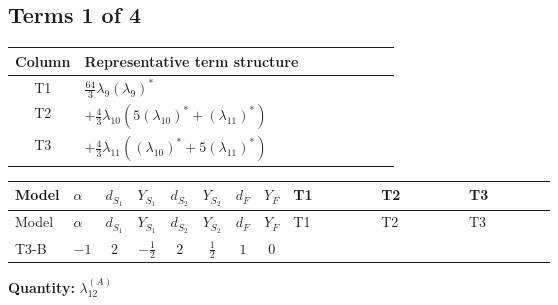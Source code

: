 \documentclass[8pt]{article}
\begin{document}
\begin{landscape}
\subsection*{Terms 1 of 4}
\begin{center}
\begin{tabular}{@{}c >{\raggedright\arraybackslash}p{0.82\linewidth}@{}}
\toprule
Column & Representative term structure \\
\midrule
T1 & \(\displaystyle \frac{64}{3} {\lambda_9} \left({\lambda_9}\right)^{*}\) \\
\midrule
T2 & \(\displaystyle +\frac{4}{3} {\lambda_{10}} (5 \left({\lambda_{10}}\right)^{*}+\left({\lambda_{11}}\right)^{*})\) \\
\midrule
T3 & \(\displaystyle +\frac{4}{3} {\lambda_{11}} (\left({\lambda_{10}}\right)^{*}+5 \left({\lambda_{11}}\right)^{*})\) \\
\midrule
\bottomrule
\end{tabular}
\end{center}
\smallskip
\tiny
\begin{longtable}{@{}llcccccc >{\raggedright\arraybackslash}p{0.21\linewidth} >{\raggedright\arraybackslash}p{0.21\linewidth} >{\raggedright\arraybackslash}p{0.21\linewidth}@{}}
\toprule
Model & $\alpha$ & $d_{S_1}$ & $Y_{S_1}$ & $d_{S_2}$ & $Y_{S_2}$ & $d_F$ & $Y_F$ & T1 & T2 & T3 \\
\midrule
\endfirsthead
\toprule
Model & $\alpha$ & $d_{S_1}$ & $Y_{S_1}$ & $d_{S_2}$ & $Y_{S_2}$ & $d_F$ & $Y_F$ & T1 & T2 & T3 \\
\midrule
\endhead
T3-B & $-1$ & $2$ & $-\frac{1}{2}$ & $2$ & $\frac{1}{2}$ & $1$ & $0$ & \scriptsize\adjustbox{max width=\linewidth}{$\begin{gathered} \frac{64}{3} {\lambda_9} \left({\lambda_9}\right)^{*}\end{gathered}$} & \scriptsize\adjustbox{max width=\linewidth}{$\begin{gathered} +\frac{4}{3} {\lambda_{10}} (5 \left({\lambda_{10}}\right)^{*}+\left({\lambda_{11}}\right)^{*})\end{gathered}$} & \scriptsize\adjustbox{max width=\linewidth}{$\begin{gathered} +\frac{4}{3} {\lambda_{11}} (\left({\lambda_{10}}\right)^{*}+5 \left({\lambda_{11}}\right)^{*})\end{gathered}$} \\
\midrule
\bottomrule
\end{longtable}
\clearpage
\noindent\textbf{Quantity: }$\lambda_{12}^{(A)}$\par\smallskip

\end{landscape}
\end{document}
